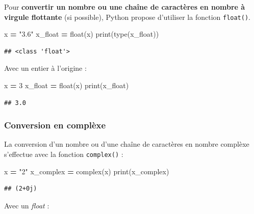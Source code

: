 \documentclass[
  12pt,
]{book}
\newenvironment{Shaded}{\begin{snugshade}}{\end{snugshade}}
\newcommand{\BuiltInTok}[1]{#1}
\newcommand{\DecValTok}[1]{\textcolor[rgb]{0.00,0.00,0.81}{#1}}
\newcommand{\NormalTok}[1]{#1}
\newcommand{\OperatorTok}[1]{\textcolor[rgb]{0.81,0.36,0.00}{\textbf{#1}}}
\newcommand{\StringTok}[1]{\textcolor[rgb]{0.31,0.60,0.02}{#1}}
\numberwithin{equation}{section}
\numberwithin{countremarque}{section}
\begin{document}
Pour \textbf{convertir un nombre ou une chaîne de caractères en nombre à virgule flottante} (si possible), Python propose d'utiliser la fonction \texttt{float()}.

\begin{Shaded}
\begin{Highlighting}[]
\NormalTok{x }\OperatorTok{=} \StringTok{"3.6"}
\NormalTok{x\_float }\OperatorTok{=} \BuiltInTok{float}\NormalTok{(x)}
\BuiltInTok{print}\NormalTok{(}\BuiltInTok{type}\NormalTok{(x\_float))}
\end{Highlighting}
\end{Shaded}

\begin{lstlisting}
## <class 'float'>
\end{lstlisting}

Avec un entier à l'origine :

\begin{Shaded}
\begin{Highlighting}[]
\NormalTok{x }\OperatorTok{=} \DecValTok{3}
\NormalTok{x\_float }\OperatorTok{=} \BuiltInTok{float}\NormalTok{(x)}
\BuiltInTok{print}\NormalTok{(x\_float)}
\end{Highlighting}
\end{Shaded}

\begin{lstlisting}
## 3.0
\end{lstlisting}

\subsubsection{Conversion en complèxe}\label{conversion-en-compluxe8xe}

La conversion d'un nombre ou d'une chaîne de caractères en nombre complèxe s'effectue avec la fonction \texttt{complex()} :

\begin{Shaded}
\begin{Highlighting}[]
\NormalTok{x }\OperatorTok{=} \StringTok{"2"}
\NormalTok{x\_complex }\OperatorTok{=} \BuiltInTok{complex}\NormalTok{(x)}
\BuiltInTok{print}\NormalTok{(x\_complex)}
\end{Highlighting}
\end{Shaded}

\begin{lstlisting}
## (2+0j)
\end{lstlisting}

Avec un \emph{float} :
\end{document}

